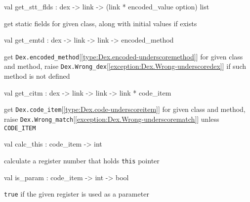 \documentclass[11pt]{article}
\begin{document}
\label{val:Dex.get-underscorestt-underscoreflds}\begin{ocamldoccode}
val get_stt_flds : dex -> link -> (link * encoded_value option) list
\end{ocamldoccode}
\begin{ocamldocdescription}
get static fields for given class, along with initial values if exists


\end{ocamldocdescription}




\label{val:Dex.get-underscoreemtd}\begin{ocamldoccode}
val get_emtd : dex -> link -> link -> encoded_method
\end{ocamldoccode}
\begin{ocamldocdescription}
get {\tt{Dex.encoded\_method}}[\ref{type:Dex.encoded-underscoremethod}] for given class and method,
 raise {\tt{Dex.Wrong\_dex}}[\ref{exception:Dex.Wrong-underscoredex}] if such method is not defined


\end{ocamldocdescription}




\label{val:Dex.get-underscorecitm}\begin{ocamldoccode}
val get_citm : dex -> link -> link -> link * code_item
\end{ocamldoccode}
\begin{ocamldocdescription}
get {\tt{Dex.code\_item}}[\ref{type:Dex.code-underscoreitem}] for given class and method,
 raise {\tt{Dex.Wrong\_match}}[\ref{exception:Dex.Wrong-underscorematch}] unless {\tt{CODE\_ITEM}}


\end{ocamldocdescription}




\label{val:Dex.calc-underscorethis}\begin{ocamldoccode}
val calc_this : code_item -> int
\end{ocamldoccode}
\begin{ocamldocdescription}
calculate a register number that holds {\tt{this}} pointer


\end{ocamldocdescription}




\label{val:Dex.is-underscoreparam}\begin{ocamldoccode}
val is_param : code_item -> int -> bool
\end{ocamldoccode}
\begin{ocamldocdescription}
{\tt{true}} if the given register is used as a parameter


\end{ocamldocdescription}
\end{document}
